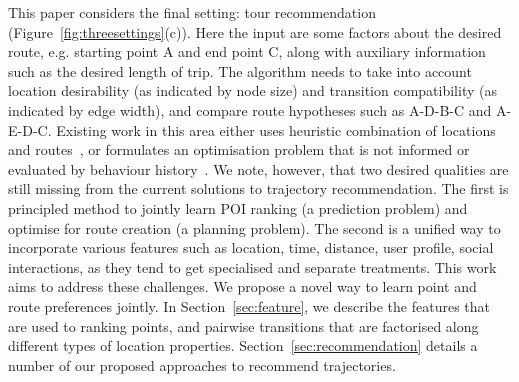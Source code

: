 This paper considers the final setting: tour recommendation (Figure~\ref{fig:threesettings}(c)). Here the input are some factors about the desired route, e.g. starting point A and end point C, along with auxiliary information such as the desired length of trip. The algorithm needs to take into account location desirability (as indicated by node size) and transition compatibility (as indicated by edge width), and compare route hypotheses such as A-D-B-C and A-E-D-C. Existing work in this area either uses heuristic combination of locations and routes~\cite{lu2010photo2trip,ijcai15,lu2012personalized}, or formulates an optimisation problem that is not informed or evaluated by behaviour history~\cite{gioniswsdm14,chen2015tripplanner}.
%
We note, however, that two desired qualities are still
missing from the current solutions to trajectory recommendation.
The first is principled method to jointly learn POI ranking (a prediction problem)
and optimise for route creation (a planning problem).
The second is a unified way to incorporate various features
such as location, time, distance, user profile, social interactions,
as they tend to get specialised and separate treatments.
This work aims to address these challenges. %
We propose a novel way to learn point and route preferences jointly.
In Section~\ref{sec:feature}, we describe the features that are used to ranking points,
and pairwise transitions that are factorised along %
different types of location properties.
Section~\ref{sec:recommendation} details a number of our proposed approaches to recommend trajectories.
